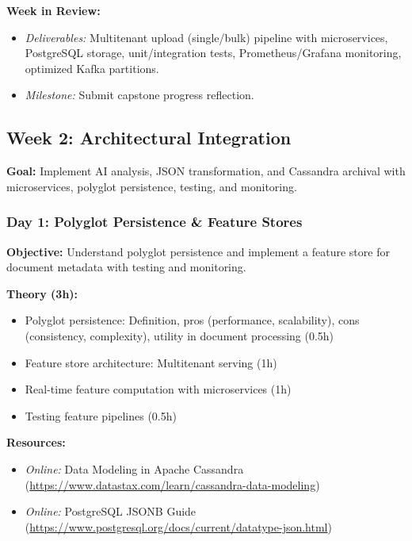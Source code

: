 \documentclass[11pt]{article}
\begin{document}
\textbf{Week in Review:}
\begin{itemize}
    \item \textit{Deliverables:} Multitenant upload (single/bulk) pipeline with microservices, PostgreSQL storage, unit/integration tests, Prometheus/Grafana monitoring, optimized Kafka partitions.
    \item \textit{Milestone:} Submit capstone progress reflection.
\end{itemize}

\subsection{Week 2: Architectural Integration}
\textbf{Goal:} Implement AI analysis, JSON transformation, and Cassandra archival with microservices, polyglot persistence, testing, and monitoring.

\subsubsection{Day 1: Polyglot Persistence \& Feature Stores}
\textbf{Objective:} Understand polyglot persistence and implement a feature store for document metadata with testing and monitoring.

\textbf{Theory (3h):}
\begin{itemize}
    \item Polyglot persistence: Definition, pros (performance, scalability), cons (consistency, complexity), utility in document processing (0.5h)
    \item Feature store architecture: Multitenant serving (1h)
    \item Real-time feature computation with microservices (1h)
    \item Testing feature pipelines (0.5h)
\end{itemize}
\textbf{Resources:}
\begin{itemize}
    \item \textit{Online:} Data Modeling in Apache Cassandra (\url{https://www.datastax.com/learn/cassandra-data-modeling})
    \item \textit{Online:} PostgreSQL JSONB Guide (\url{https://www.postgresql.org/docs/current/datatype-json.html})
\end{itemize}
\end{document}
